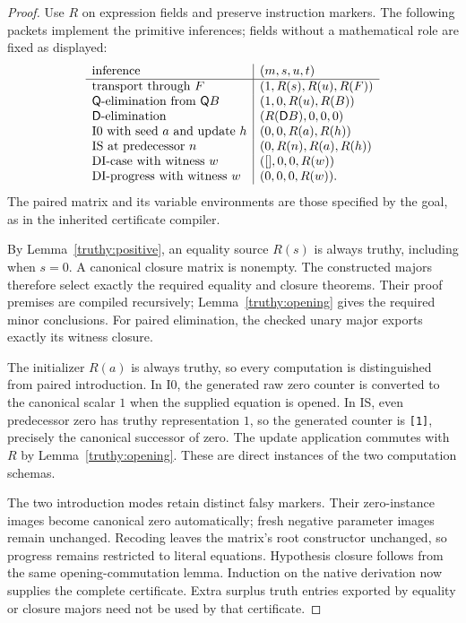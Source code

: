 \begin{proof}
Use \(R\) on expression fields and preserve instruction markers.
The following packets implement the primitive inferences; fields
without a mathematical role are fixed as displayed:
\[
\begin{array}{l|l}
\text{inference}&(m,s,u,t)\\ \hline
\text{transport through }F&(1,R(s),R(u),R(F))\\
\mathsf Q\text{-elimination from }\mathsf Q B&(1,0,R(u),R(B))\\
\mathsf D\text{-elimination}&(R(\mathsf D B),0,0,0)\\
\mathrm{I0}\text{ with seed }a\text{ and update }h
 &(0,0,R(a),R(h))\\
\mathrm{IS}\text{ at predecessor }n
 &(0,R(n),R(a),R(h))\\
\mathrm{DI\text{-}case}\text{ with witness }w
 &([],0,0,R(w))\\
\mathrm{DI\text{-}progress}\text{ with witness }w
 &(0,0,0,R(w)).
\end{array}
\]
The paired matrix and its variable environments are those specified
by the goal, as in the inherited certificate compiler.

By Lemma~\ref{truthy:positive}, an equality source \(R(s)\) is always
truthy, including when \(s=0\).  A canonical closure matrix is
nonempty.  The constructed majors therefore select exactly the
required equality and closure theorems.  Their proof premises are
compiled recursively; Lemma~\ref{truthy:opening} gives the required
minor conclusions.  For paired elimination, the checked unary major
exports exactly its witness closure.

The initializer \(R(a)\) is always truthy, so every computation is
distinguished from paired introduction.  In I0, the generated raw
zero counter is converted to the canonical scalar \(1\) when the
supplied equation is opened.  In IS, even predecessor zero has
truthy representation \(1\), so the generated counter is
\texttt{[1]}, precisely the canonical successor of zero.
The update application commutes with \(R\) by
Lemma~\ref{truthy:opening}.  These are direct instances of the two
computation schemas.

The two introduction modes retain distinct falsy markers.
Their zero-instance images become canonical zero automatically;
fresh negative parameter images remain unchanged.  Recoding leaves
the matrix's root constructor unchanged, so progress remains
restricted to literal equations.  Hypothesis closure follows from
the same opening-commutation lemma.  Induction on the native
derivation now supplies the complete certificate.  Extra surplus
truth entries exported by equality or closure majors need not be
used by that certificate.


\end{proof}
